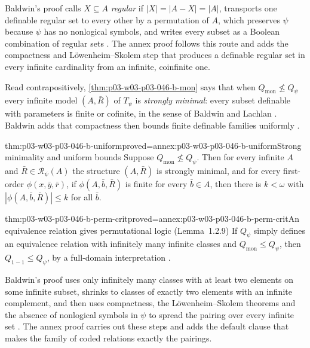 Baldwin's proof calls \(X\subseteq A\) \emph{regular} if
\(|X|=|A-X|=|A|\), transports one definable regular set to every other by
a permutation of \(A\), which preserves \(\psi\) because \(\psi\) has no
nonlogical symbols, and writes every subset as a Boolean combination of
regular sets \cite[p.~449]{Baldwin1985DSOQ}. The annex proof follows this
route and adds the compactness and L\"owenheim--Skolem step that produces
a definable regular set in every infinite cardinality from an infinite,
coinfinite one.

Read contrapositively, \cref{thm:p03-w03-p03-046-b-mon} says that when
\(Q_{\mathrm{mon}}\not\le Q_\psi\) every infinite model \((A,\bar R)\) of
\(T_\psi\) is \emph{strongly minimal}: every subset definable with
parameters is finite or cofinite, in the sense of Baldwin and Lachlan
\cite[p.~449]{Baldwin1985DSOQ}. Baldwin adds that compactness then bounds
finite definable families uniformly \cite[pp.~449--450]{Baldwin1985DSOQ}.

\begin{hblemma}{thm:p03-w03-p03-046-b-uniform}{proved=annex:p03-w03-p03-046-b-uniform}{Strong minimality and uniform bounds}
Suppose \(Q_{\mathrm{mon}}\not\le Q_\psi\). Then for every infinite \(A\)
and \(\bar R\in\mathscr R_\psi(A)\) the structure \((A,\bar R)\) is
strongly minimal, and for every first-order \(\phi(x,\bar y,\bar r)\), if
\(\phi(A,\bar b,\bar R)\) is finite for every \(\bar b\in A\), then there
is \(k<\omega\) with \(|\phi(A,\bar b,\bar R)|\le k\) for all \(\bar b\).
\end{hblemma}

\begin{hblemma}{thm:p03-w03-p03-046-b-perm-crit}{proved=annex:p03-w03-p03-046-b-perm-crit}{An equivalence relation gives permutational logic (Lemma~1.2.9)}
If \(Q_\psi\) simply defines an equivalence relation with infinitely many
infinite classes and \(Q_{\mathrm{mon}}\le Q_\psi\), then
\(Q_{1-1}\le Q_\psi\), by a full-domain interpretation
\cite[p.~450, Lemma~1.2.9]{Baldwin1985DSOQ}.
\end{hblemma}

Baldwin's proof uses only infinitely many classes with at least two
elements on some infinite subset, shrinks to classes of exactly two
elements with an infinite complement, and then uses compactness, the
L\"owenheim--Skolem theorems and the absence of nonlogical symbols in
\(\psi\) to spread the pairing over every infinite set
\cite[p.~450]{Baldwin1985DSOQ}. The annex proof carries out these steps and
adds the default clause that makes the family of coded relations exactly
the pairings.

